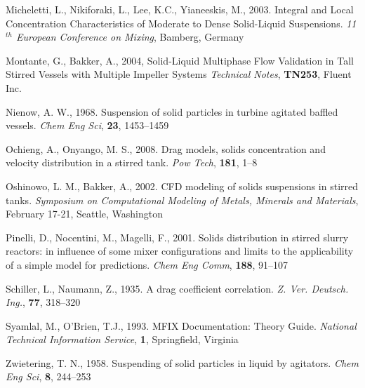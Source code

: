 \begin{thebibliography}{99}
 Micheletti, L., Nikiforaki, L., Lee, K.C., Yianeeskis, M., 2003. Integral and Local Concentration Characteristics of Moderate to Dense Solid-Liquid Suspensions. \textit{11$^{th}$ European Conference on Mixing}, Bamberg, Germany

 Montante, G., Bakker, A., 2004, Solid-Liquid Multiphase Flow Validation in Tall Stirred Vessels with Multiple Impeller Systems \textit{Technical Notes}, \textbf{TN253}, Fluent Inc.

 Nienow, A. W., 1968. Suspension of solid particles in turbine agitated baffled vessels. \textit{Chem Eng Sci}, \textbf{23}, 1453--1459 

 Ochieng, A., Onyango, M. S., 2008. Drag models, solids concentration and velocity distribution in a stirred tank. \textit{Pow Tech}, \textbf{181}, 1--8

 Oshinowo, L. M., Bakker, A., 2002. CFD modeling of solids suspensions in stirred tanks. \textit{Symposium on Computational Modeling of Metals, Minerals and Materials}, February 17-21, Seattle, Washington 

 Pinelli, D., Nocentini, M., Magelli, F., 2001. Solids distribution in stirred slurry reactors: in influence of some mixer configurations and limits to the applicability of a simple model for predictions.
\textit{Chem Eng Comm}, \textbf{188}, 91--107

 Schiller, L., Naumann, Z., 1935. A drag coefficient correlation. \textit{Z. Ver. Deutsch. Ing.}, \textbf{77}, 318--320

 Syamlal, M., O'Brien, T.J., 1993. MFIX Documentation: Theory Guide. \textit{National Technical Information Service}, \textbf{1}, Springfield, Virginia 

 Zwietering, T. N., 1958. Suspending of solid particles in liquid by agitators. \textit{Chem Eng Sci}, \textbf{8}, 244--253 

\end{thebibliography}
